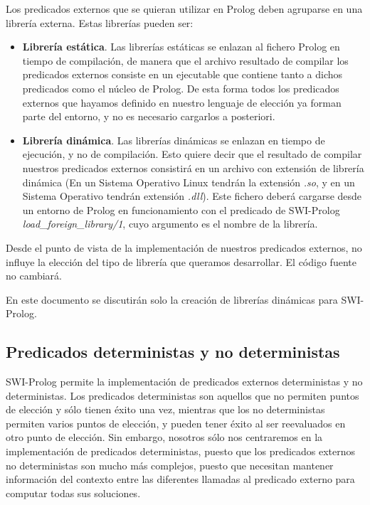 \documentclass[a4paper,12pt]{article}
\begin{document}
Los predicados externos que se quieran utilizar en Prolog deben agruparse en una librería externa. Estas librerías pueden ser:

\begin{itemize}
\item \textbf{Librería estática}. Las librerías estáticas se enlazan al fichero Prolog en tiempo de compilación, de manera que el archivo resultado de compilar los predicados externos consiste en un ejecutable que contiene tanto a dichos predicados como el núcleo de Prolog. De esta forma todos los predicados externos que hayamos definido en nuestro lenguaje de elección ya forman parte del entorno, y no es necesario cargarlos a posteriori.
\item \textbf{Librería dinámica}. Las librerías dinámicas se enlazan en tiempo de ejecución, y no de compilación. Esto quiere decir que el resultado de compilar nuestros predicados externos consistirá en un archivo con extensión de librería dinámica (En un Sistema Operativo Linux tendrán la extensión \textit{.so}, y en un Sistema Operativo tendrán extensión \textit{.dll}). Este fichero deberá cargarse desde un entorno de Prolog en funcionamiento con el predicado de SWI-Prolog   \textit{load\_foreign\_library/1}, cuyo argumento es el nombre de la librería.
\end{itemize}

Desde el punto de vista de la implementación de nuestros predicados externos, no influye la elección del tipo de librería que queramos desarrollar. El código fuente no cambiará.

En este documento se discutirán solo la creación de librerías dinámicas para SWI-Prolog.
\subsection{Predicados deterministas y no deterministas}

SWI-Prolog permite la implementación de predicados externos deterministas y no deterministas. Los predicados deterministas son aquellos que no permiten puntos de elección y sólo tienen éxito una vez, mientras que los no deterministas permiten varios puntos de elección, y pueden tener éxito al ser reevaluados en otro punto de elección. Sin embargo, nosotros sólo nos centraremos en la implementación de predicados deterministas, puesto que los predicados externos no deterministas son mucho más complejos, puesto que necesitan mantener información del contexto entre las diferentes llamadas al predicado externo para computar todas sus soluciones.
\end{document}
